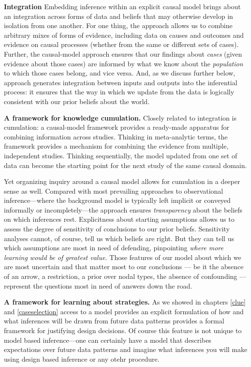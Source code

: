 \documentclass[
  12pt,
]{book}
\begin{document}
\textbf{Integration} Embedding inference within an explicit causal model brings about an integration across forms of data and beliefs that may otherwise develop in isolation from one another. For one thing, the approach allows us to combine arbitrary mixes of forms of evidence, including data on causes and outcomes and evidence on causal processes (whether from the same or different sets of cases). Further, the causal-model approach ensures that our findings about \emph{cases} (given evidence about those cases) are informed by what we know about the \emph{population} to which those cases belong, and vice versa. And, as we discuss further below, approach generates integration between inputs and outputs into the inferential process: it ensures that the way in which we update from the data is logically consistent with our prior beliefs about the world.

\textbf{A framework for knowledge cumulation.} Closely related to integration is cumulation: a causal-model framework provides a ready-made apparatus for combining information across studies. Thinking in meta-analytic terms, the framework provides a mechanism for combining the evidence from multiple, independent studies. Thinking sequentially, the model updated from one set of data can become the starting point for the next study of the same causal domain.

Yet organizing inquiry around a causal model allows for cumulation in a deeper sense as well. Compared with most prevailing approaches to observational inference---where the background model is typically left implicit or conveyed informally or incompletely---the approach ensures \emph{transparency} about the beliefs on which inferences rest. Explicitness about starting assumptions allows us to assess the degree of sensitivity of conclusions to our prior beliefs. Sensitivity analyses cannot, of course, tell us which beliefs are right. But they can tell us which assumptions are most in need of defending, pinpointing \emph{where more learning would be of greatest value.} Those features of our model about which we are most uncertain and that matter most to our conclusions --- be it the absence of an arrow, a restriction, a prior over nodal types, the absence of confounding --- represent the questions most in need of answers down the road.

\textbf{A framework for learning about strategies.} As we showed in chapters \ref{clue} and \ref{caseselection} access to a model provides an explicit formulation of how and what inferences will be drawn from future data patterns provides a formal framework for justifying design decisions. Of course this feature is not unique to model based inference---one can certainly have a model that describes expectations over future data patterns and imagine what inferences you will make using design based inference or any otehr procedure.
\end{document}
